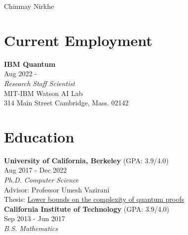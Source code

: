 \documentclass[11pt]{article}
\begin{document}


\par{
		{\LARGE {Chinmay Nirkhe}
	}\bigskip\par}



\section{Current Employment}
\textbf{IBM Quantum} \\
Aug 2022 - \\

\textit{Research Staff Scientist} \\
MIT-IBM Watson AI Lab \\
314 Main Street Cambridge, Mass. 02142


\section{Education}

\textbf{University of California, Berkeley} ({\small \textsc{GPA}: 3.9/4.0}) \\
Aug 2017 - Dec 2022\\

\textit{Ph.D. Computer Science} \\
Advisor: Professor Umesh Vazirani \\ 
Thesis: \href{https://www2.eecs.berkeley.edu/Pubs/TechRpts/2022/EECS-2022-184.html}{Lower bounds on the complexity of quantum proofs} \\

\textbf{California Institute of Technology} ({\small \textsc{GPA}: 3.9/4.0}) \\
Sep 2013 - Jun 2017 \\

\textit{B.S. Mathematics}
\end{document}
